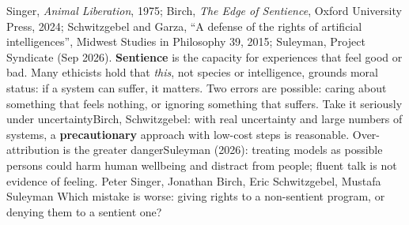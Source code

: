 {Singer, \emph{Animal Liberation}, 1975; Birch, \emph{The Edge of Sentience}, Oxford University Press, 2024; Schwitzgebel and Garza, ``A defense of the rights of artificial intelligences'', Midwest Studies in Philosophy 39, 2015; Suleyman, Project Syndicate (Sep 2026).}
{\textbf{Sentience} is the capacity for experiences that feel good or bad. Many ethicists hold that \emph{this}, not species or intelligence, grounds moral status: if a system can suffer, it matters. Two errors are possible: caring about something that feels nothing, or ignoring something that suffers.}
{Take it seriously under uncertainty}{Birch, Schwitzgebel: with real uncertainty and large numbers of systems, a \textbf{precautionary} approach with low-cost steps is reasonable.}
{Over-attribution is the greater danger}{Suleyman (2026): treating models as possible persons could harm human wellbeing and distract from people; fluent talk is not evidence of feeling.}
{Peter Singer, Jonathan Birch, Eric Schwitzgebel, Mustafa Suleyman}
{Which mistake is worse: giving rights to a non-sentient program, or denying them to a sentient one?}

